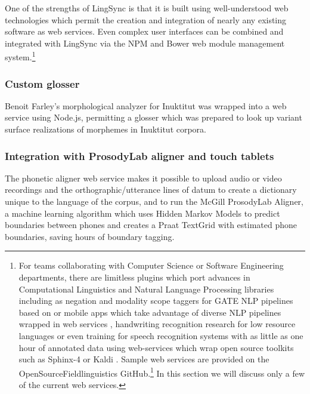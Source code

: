 \documentclass[letterpaper, 12pt, dvips]{mitwpl}
\begin{document}
One of the strengths of LingSync is that it is built using well-understood web technologies which permit the creation and integration of nearly any existing software as web services. 
Even complex user interfaces can be combined and integrated with LingSync via the NPM and Bower web module management system.\footnote{
For teams collaborating with Computer Science or Software Engineering departments, there are limitless plugins which port advances in Computational Linguistics  and Natural Language Processing libraries  \citep{Chen:2011}  including as negation and modality scope taggers for  GATE \citep{Cunningham:2011} NLP pipelines based on  \citep{Rosenberg:2012} or mobile apps which take advantage of diverse NLP pipelines wrapped in web services \citep{Sateli:2013},
 handwriting recognition research for low resource languages \citep{Sadri:2007} or even training for speech recognition systems with as little as one hour of annotated data using web-services which wrap open source toolkits such as Sphinx-4 \citep{Walker:2004} or Kaldi \citep{Povey:2011}.
Sample web services are provided on the OpenSourceFieldlinguistics GitHub.\footnote{https://github.com/OpenSourceFieldlinguistics} %
In this section we will discuss only a few of the current web services.}

\subsubsection{Custom glosser}

 Benoit Farley's \citep{Farley:2014:Online} morphological analyzer for Inuktitut was wrapped into a web service using Node.js, permitting a glosser which was prepared to look up variant  surface realizations of morphemes in Inuktitut corpora.

\subsubsection{Integration with ProsodyLab aligner and touch tablets}
\label{sec:phoneticwebservice}

The phonetic aligner web service makes it possible to upload audio or video recordings and the orthographic/utterance lines of datum to create a dictionary unique to the language of the corpus,
and to run the McGill ProsodyLab Aligner,
a machine learning algorithm which uses Hidden Markov Models to predict boundaries between phones and creates a Praat TextGrid with estimated phone boundaries,
saving hours of boundary tagging.
\end{document}
